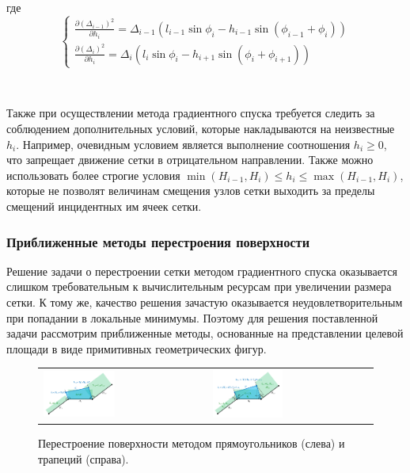 где
\begin{equation}
\begin{cases}
\frac{\partial (\Delta_{i - 1})^2}{\partial h_i} = \Delta_{i - 1} (l_{i - 1} \sin \phi_i - h_{i - 1} \sin(\phi_{i - 1} + \phi_i)) \\
\frac{\partial (\Delta_i)^2}{\partial h_i} = \Delta_i (l_i \sin \phi_i - h_{i + 1} \sin(\phi_i + \phi_{i+1}))
\end{cases}
\end{equation}

\

Также при осуществлении метода градиентного спуска требуется следить за соблюдением дополнительных условий, которые накладываются на неизвестные $h_i$.
Например, очевидным условием является выполнение соотношения $h_i \ge 0$, что запрещает движение сетки в отрицательном направлении.
Также можно использовать более строгие условия $\min(H_{i - 1}, H_i) \le h_i \le \max(H_{i - 1}, H_i)$, которые не позволят величинам смещения узлов сетки выходить за пределы смещений инцидентных им ячеек сетки.

\subsubsection{Приближенные методы перестроения поверхности}

Решение задачи о перестроении сетки методом градиентного спуска оказывается слишком требовательным к вычислительным ресурсам при увеличении размера сетки.
К тому же, качество решения зачастую оказывается неудовлетворительным при попадании в локальные минимумы.
Поэтому для решения поставленной задачи рассмотрим приближенные методы, основанные на представлении целевой площади в виде примитивных геометрических фигур.

\begin{figure}[ht]
\centering
\begin{tabular}{ll}
\includegraphics[width=0.45\textwidth]{pics/text_1_remesh_2d/remesh_rectangles.pdf}
&
\includegraphics[width=0.45\textwidth]{pics/text_1_remesh_2d/remesh_trapeziums.pdf}
\end{tabular}
\singlespacing
{}\caption{Перестроение поверхности методом прямоугольников (слева) и трапеций (справа).}
\label{fig:text_1_remesh_2d_rectangles_and_trapeziums}
\end{figure}

